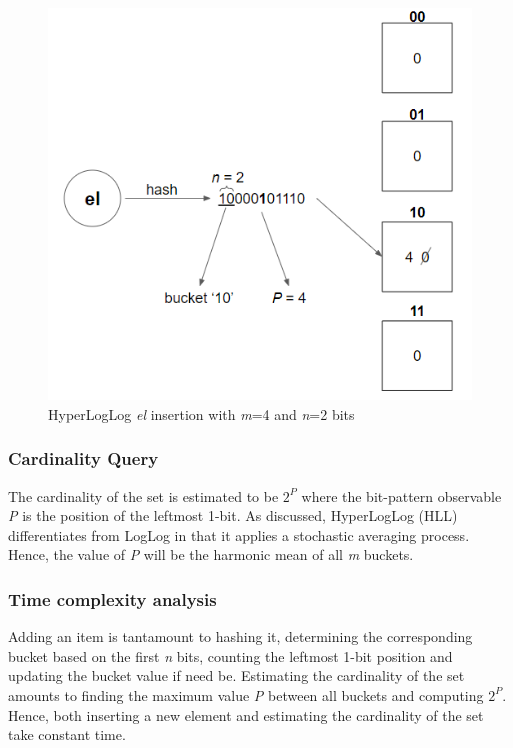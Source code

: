 \begin{figure}[!htb]
    \begin{center}
      \includegraphics[scale=1]{figures/hll-insertion.png}
      \caption[HyperLogLog insertion]{HyperLogLog \textit{el} insertion with \textit{m}=4 and \textit{n}=2 bits}
      \label{fig:hll-insert}
    \end{center}
\end{figure}

\subsubsection*{Cardinality Query}
The cardinality of the set is estimated to be $2^\textit{P}$ where the bit-pattern observable \textit{P} is the position of the leftmost 1-bit. As discussed, HyperLogLog (HLL) differentiates from LogLog in that it applies a stochastic averaging process. Hence, the value of \textit{P} will be the harmonic mean of all \textit{m} buckets.


\subsubsection*{Time complexity analysis}
Adding an item is tantamount to hashing it, determining the corresponding bucket based on the first \textit{n} bits, counting the leftmost 1-bit position and updating the bucket value if need be. Estimating the cardinality of the set amounts to finding the maximum value \textit{P} between all buckets and computing $2^P$. Hence, both inserting a new element and estimating the cardinality of the set take constant time.

